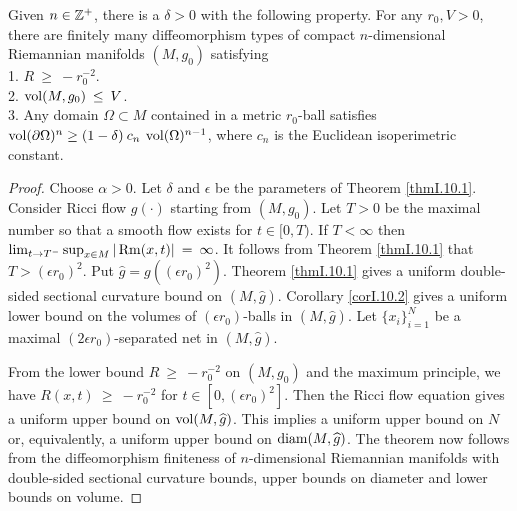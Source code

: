 \begin{theorem}
  \label{thm:kl-diffeomorphism-finiteness-existence-riemannian-metrics}

Given $n \in {\mathbb Z}^+$, there is a $\delta > 0$ with the following property.  For any
$r_0, V > 0$, there are finitely many diffeomorphism types
of compact $n$-dimensional Riemannian manifolds $(M, g_0)$ satisfying \\
1. $R \: \ge \: - r_0^{-2}$. \\
2. $\operatorname{vol}(M, g_0) \: \le \: V$. \\
3. Any domain $\Omega \subset M$ contained in a metric
$r_0$-ball satisfies $\operatorname{vol}(\partial \Omega)^n
\ge (1-\delta) \: c_n \: \operatorname{vol}(\Omega)^{n-1}$, where $c_n$ is the
Euclidean isoperimetric constant.
\end{theorem}
\begin{proof}
Choose $\alpha > 0$. Let $\delta$ and $\epsilon$ be the parameters
of Theorem \ref{thmI.10.1}.
Consider Ricci flow $g(\cdot)$ starting from $(M, g_0)$.
Let $T > 0$ be the maximal number so that a smooth flow exists
for $t \in [0, T)$.  If $T < \infty$ then
$\lim_{t \rightarrow T^-} \sup_{x \in M} |\operatorname{Rm}(x, t)| \: = \: \infty$. It
follows from Theorem \ref{thmI.10.1} that $T > (\epsilon r_0)^2$.
Put $\widehat{g} = g((\epsilon r_0)^2)$. Theorem \ref{thmI.10.1} gives a
uniform double-sided sectional curvature bound on $(M, \widehat{g})$.
Corollary \ref{corI.10.2} gives a uniform lower bound on the volumes
of $(\epsilon r_0)$-balls in $(M, \widehat{g})$. Let $\{x_i\}_{i=1}^N$ be a
maximal $(2\epsilon r_0)$-separated net in $(M, \widehat{g})$.

From the lower bound $R \: \ge \: - r_0^{-2}$ on $(M, g_0)$ and the
maximum principle, we have
$R(x,t)  \: \ge \: - r_0^{-2}$ for $t \in [0, (\epsilon r_0)^2]$.
Then the Ricci flow equation gives
a uniform upper bound on $\operatorname{vol}(M, \widehat{g})$. This implies a uniform
upper bound on $N$ or, equivalently, a uniform upper bound on
$\operatorname{diam}(M, \widehat{g})$. The theorem now follows from the diffeomorphism
finiteness of $n$-dimensional Riemannian
manifolds with double-sided sectional curvature bounds,
upper bounds on diameter and lower bounds on volume.
\end{proof}




